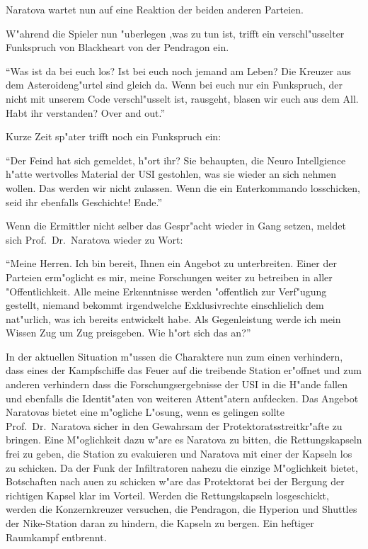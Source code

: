Naratova wartet nun auf eine Reaktion der beiden anderen Parteien.

W"ahrend die Spieler nun "uberlegen ,was zu tun ist, trifft ein verschl"usselter Funkspruch von Blackheart von der Pendragon ein.

"`Was ist da bei euch los? Ist bei euch noch jemand am Leben? Die Kreuzer aus dem Asteroideng"urtel sind gleich da. Wenn bei euch nur ein Funkspruch, der nicht mit unserem Code verschl"usselt ist, rausgeht, blasen wir euch aus dem All. Habt ihr verstanden? Over and out."'

Kurze Zeit sp"ater trifft noch ein Funkspruch ein:

"`Der Feind hat sich gemeldet, h"ort ihr? Sie behaupten, die Neuro Intellgience h"atte wertvolles Material der USI gestohlen, was sie wieder an sich nehmen wollen. Das werden wir nicht zulassen. Wenn die ein Enterkommando losschicken, seid ihr ebenfalls Geschichte! Ende."'

Wenn die Ermittler nicht selber das Gespr"acht wieder in Gang setzen, meldet sich Prof.~Dr.~Naratova wieder zu Wort:

"`Meine Herren. Ich bin bereit, Ihnen ein Angebot zu unterbreiten. Einer der Parteien erm"oglicht es mir, meine Forschungen weiter zu betreiben in aller "Offentlichkeit. Alle meine Erkenntnisse werden "offentlich zur Verf"ugung gestellt, niemand bekommt irgendwelche Exklusivrechte einschlie\3lich dem nat"urlich, was ich bereits entwickelt habe. Als Gegenleistung werde ich mein Wissen Zug um Zug preisgeben. Wie h"ort sich das an?"'

In der aktuellen Situation m"ussen die Charaktere nun zum einen verhindern, dass eines der Kampfschiffe das Feuer auf die treibende Station er"offnet und zum anderen verhindern dass die Forschungsergebnisse der USI in die H"ande fallen und ebenfalls die Identit"aten von weiteren Attent"atern aufdecken. Das Angebot Naratovas bietet eine m"ogliche L"osung, wenn es gelingen sollte Prof.~Dr.~Naratova sicher in den Gewahrsam der Protektoratsstreitkr"afte zu bringen. Eine M"oglichkeit dazu w"are es Naratova zu bitten, die Rettungskapseln frei zu geben, die Station zu evakuieren und Naratova mit einer der Kapseln los zu schicken. Da der Funk der Infiltratoren nahezu die einzige M"oglichkeit bietet, Botschaften nach au\3en zu schicken w"are das Protektorat bei der Bergung der richtigen Kapsel klar im Vorteil. Werden die Rettungskapseln losgeschickt, werden die Konzernkreuzer versuchen, die Pendragon, die Hyperion und Shuttles der Nike-Station daran zu hindern, die Kapseln zu bergen. Ein heftiger Raumkampf entbrennt.


